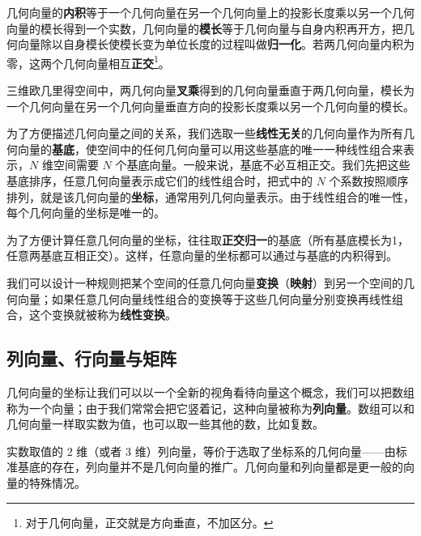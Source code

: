 几何向量的\textbf{内积}等于一个几何向量在另一个几何向量上的投影长度乘以另一个几何向量的模长得到一个实数，几何向量的\textbf{模长}等于几何向量与自身内积再开方，把几何向量除以自身模长使模长变为单位长度的过程叫做\textbf{归一化}。若两几何向量内积为零，这两个几何向量相互\textbf{正交}\footnote{对于几何向量，正交就是方向垂直，不加区分。}。

三维欧几里得空间中，两几何向量\textbf{叉乘}得到的几何向量垂直于两几何向量，模长为一个几何向量在另一个几何向量垂直方向的投影长度乘以另一个几何向量的模长。

为了方便描述几何向量之间的关系，我们选取一些\textbf{线性无关}的几何向量作为所有几何向量的\textbf{基底}，使空间中的任何几何向量可以用这些基底的唯一一种线性组合来表示，$N$ 维空间需要 $N$ 个基底向量。一般来说，基底不必互相正交。我们先把这些基底排序，任意几何向量表示成它们的线性组合时，把式中的 $N$ 个系数按照顺序排列，就是该几何向量的\textbf{坐标}，通常用列几何向量表示。由于线性组合的唯一性，每个几何向量的坐标是唯一的。

为了方便计算任意几何向量的坐标，往往取\textbf{正交归一}的基底（所有基底模长为1，任意两基底互相正交）。这样，任意向量的坐标都可以通过与基底的内积得到。



我们可以设计一种规则把某个空间的任意几何向量\textbf{变换}（\textbf{映射}）到另一个空间的几何向量；如果任意几何向量线性组合的变换等于这些几何向量分别变换再线性组合，这个变换就被称为\textbf{线性变换}。


\subsection{列向量、行向量与矩阵}

几何向量的坐标让我们可以以一个全新的视角看待向量这个概念，我们可以把数组称为一个向量；由于我们常常会把它竖着记，这种向量被称为\textbf{列向量}。数组可以和几何向量一样取实数为值，也可以取一些其他的数，比如复数。


实数取值的 $2$ 维（或者 $3$ 维）列向量，等价于选取了坐标系的几何向量——由标准基底的存在，列向量并不是几何向量的推广。几何向量和列向量都是更一般的向量的特殊情况。

